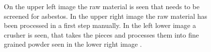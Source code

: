 \begin{figure}[h]
\centering

\caption{On the upper left image the raw material is seen that needs to be screened for asbestos. In the upper right image the raw material has been processed in a first step manually. In the left lower image a crusher is seen, that takes the pieces and processes them into fine grained powder seen in the lower right image \cite{mohammed2015}. }
\label{fig:sampleprep}
\end{figure}


